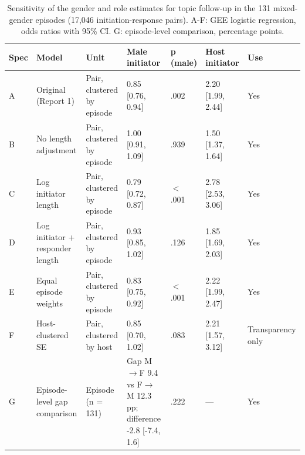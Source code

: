 \begin{table}[htbp]
\centering
\small
\caption{Sensitivity of the gender and role estimates for topic follow-up in the 131 mixed-gender episodes (17,046 initiation-response pairs). A-F: GEE logistic regression, odds ratios with 95\% CI. G: episode-level comparison, percentage points.}
\label{tab:table_S1_sensitivity}
\begin{tabular}{lllllll}
\toprule
Spec & Model & Unit & Male initiator & p (male) & Host initiator & Use \\
\midrule
A & Original (Report 1) & Pair, clustered by episode & 0.85 [0.76, 0.94] & .002 & 2.20 [1.99, 2.44] & Yes \\
B & No length adjustment & Pair, clustered by episode & 1.00 [0.91, 1.09] & .939 & 1.50 [1.37, 1.64] & Yes \\
C & Log initiator length & Pair, clustered by episode & 0.79 [0.72, 0.87] & $<$ .001 & 2.78 [2.53, 3.06] & Yes \\
D & Log initiator + responder length & Pair, clustered by episode & 0.93 [0.85, 1.02] & .126 & 1.85 [1.69, 2.03] & Yes \\
E & Equal episode weights & Pair, clustered by episode & 0.83 [0.75, 0.92] & $<$ .001 & 2.22 [1.99, 2.47] & Yes \\
F & Host-clustered SE & Pair, clustered by host & 0.85 [0.70, 1.02] & .083 & 2.21 [1.57, 3.12] & Transparency only \\
G & Episode-level gap comparison & Episode (n = 131) & Gap M$\rightarrow$F 9.4 vs F$\rightarrow$M 12.3 pp; difference -2.8 [-7.4, 1.6] & .222 & — & Yes \\
\bottomrule
\end{tabular}
\end{table}
